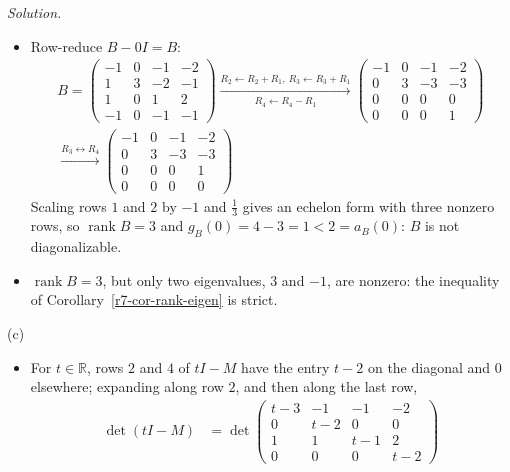 \documentclass[12pt]{article}
\newcommand{\R}{\mathbb R}
\DeclareMathOperator{\rank}{rank}
\theoremstyle{definition}
\newenvironment{solution}{\par\noindent\textit{Solution.}\ }{\par\smallskip}
\begin{document}
\begin{solution}
\begin{itemize}
\[\begin{aligned}
=(t-3)\det\begin{pmatrix}t+1&1&2\\-1&t-1&-2\\1&1&t+1\end{pmatrix}\\
&=(t-3)\Bigl((t+1)\bigl((t-1)(t+1)+2\bigr)-\bigl(-(t+1)+2\bigr)+2\bigl(-1-(t-1)\bigr)\Bigr)\\
&=(t-3)\bigl(t^3+t^2+t+1-1+t-2t\bigr)=(t-3)(t^3+t^2)=(t-3)t^2(t+1)
\end{aligned}
\]
So \(a_B(0)=2\) and \(a_B(3)=a_B(-1)=1\), and \(g_B(3)=g_B(-1)=1\) (Theorem~\ref{r7-thm-geo-alg}).
\item Row-reduce \(B-0I=B\):
\[
\begin{gathered}
B=\begin{pmatrix}-1&0&-1&-2\\1&3&-2&-1\\1&0&1&2\\-1&0&-1&-1\end{pmatrix}
\xrightarrow[R_4\leftarrow R_4-R_1]{R_2\leftarrow R_2+R_1,\ R_3\leftarrow R_3+R_1}
\begin{pmatrix}-1&0&-1&-2\\0&3&-3&-3\\0&0&0&0\\0&0&0&1\end{pmatrix}
\\
\xrightarrow{R_3\leftrightarrow R_4}
\begin{pmatrix}-1&0&-1&-2\\0&3&-3&-3\\0&0&0&1\\0&0&0&0\end{pmatrix}
\end{gathered}
\]
Scaling rows \(1\) and \(2\) by \(-1\) and \(\frac13\) gives an echelon form with three nonzero rows, so \(\rank B=3\)
and \(g_B(0)=4-3=1<2=a_B(0)\): \(B\) is not diagonalizable.
\item \(\rank B=3\), but only two eigenvalues, \(3\) and \(-1\), are nonzero: the inequality of
Corollary~\ref{r7-cor-rank-eigen} is strict.
\end{itemize}
(c)
\begin{itemize}
\item For \(t\in\R\), rows \(2\) and \(4\) of \(tI-M\) have the entry \(t-2\) on the diagonal and \(0\) elsewhere;
expanding along row \(2\), and then along the last row,
\[
\begin{aligned}
\det(tI-M)&=\det\begin{pmatrix}t-3&-1&-1&-2\\0&t-2&0&0\\1&1&t-1&2\\0&0&0&t-2\end{pmatrix}

\end{aligned}\]
\end{itemize}
\end{solution}
\end{document}
